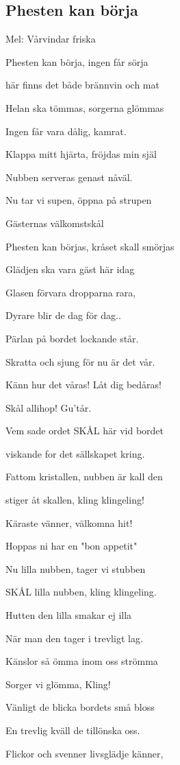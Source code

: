 \subsection{\textbf{Phesten kan börja}}

Mel: Vårvindar friska \bigskip

Phesten kan börja, ingen får sörja

här finns det både brännvin och mat

Helan ska tömmas, sorgerna glömmas

Ingen får vara dålig, kamrat.\bigskip

Klappa mitt hjärta, fröjdas min själ

Nubben serveras genast nåväl.

Nu tar vi supen, öppna på strupen

Gästernas välkomstskål\bigskip

Phesten kan börjas, kråset skall smörjas

Glädjen ska vara gäst här idag

Glasen förvara dropparna rara,

Dyrare blir de dag för dag..\bigskip

Pärlan på bordet lockande står.

Skratta och sjung för nu är det vår.

Känn hur det våras! Låt dig bedåras!

Skål allihop! Gu’tår. \bigskip

Vem sade ordet SKÅL här vid bordet

viskande for det sällskapet kring.

Fattom kristallen, nubben är kall den

stiger åt skallen, kling klingeling!\bigskip

Käraste vänner, välkomna hit!

Hoppas ni har en "bon appetit"

Nu lilla nubben, tager vi stubben

SKÅL lilla nubben, kling klingeling. \bigskip

Hutten den lilla smakar ej illa

När man den tager i trevligt lag.

Känslor så ömma inom oss strömma

Sorger vi glömma, Kling!\bigskip

Vänligt de blicka bordets små bloss

En trevlig kväll de tillönska oss.

Flickor och svenner livsglädje känner,

